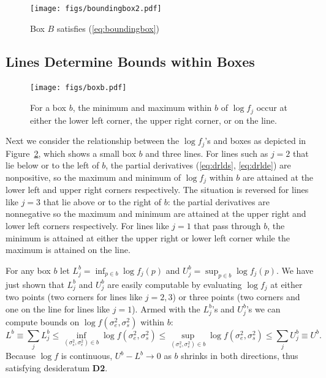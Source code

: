 \documentclass{report}
\newcommand{\RL}{f}
\newcommand{\logRL}{\log\RL}
\newcommand{\sigssq}{\sigma_s^2}
\newcommand{\sigesq}{\sigma_e^2}
\newcommand{\logRLss}{\logRL(\sigesq,\sigssq)}
\begin{document}
\begin{figure}[h]
	\centering
	\texttt{[image: figs/boundingbox2.pdf]}
	\caption{Box $B$ satisfies (\ref{eq:boundingbox})}
	\label{fig:boundingbox2}
\end{figure}

\subsection{Lines Determine Bounds within Boxes}
\label{sec:boundsinboxes}
\begin{figure}
	\centering
	\texttt{[image: figs/boxb.pdf]}
	\caption{For a box $b$,  the minimum and
	maximum within $b$ of $\logRL_j$
	occur at either the lower left corner, the upper right  corner, or
	on the line.
}	\label{fig:boxb}
\end{figure}
Next we consider the relationship between the $\logRL_j$'s and boxes as depicted in Figure~\ref{fig:boxb}, which shows a small box $b$ and three lines.  For lines such as $j=2$ that lie below or to the left of $b$, the partial derivatives (\ref{eq:drlds}, \ref{eq:drlde}) are nonpositive, so the maximum and minimum of $\logRL_j$ within $b$ are attained at the lower left and upper right corners respectively.  The situation is reversed for lines like $j=3$ that lie above or to the right of $b$: the partial derivatives are nonnegative so the maximum and minimum are attained at the upper right and lower left corners respectively.  For lines like $j=1$ that pass through $b$, the minimum is attained at either the upper right or lower left corner while the maximum is attained on the line.

For any box $b$ let $L^b_j = \inf_{p\in b} \logRL_j(p)$ and $U^b_j = \sup_{p\in b} \logRL_j(p)$.  We have just shown that $L^b_j$ and $U^b_j$ are easily computable by evaluating $\logRL_j$ at either two points (two corners for lines like $j=2,3$) or three points (two corners and one on the line for lines like $j=1$).
Armed with the $L^b_j$'s and $U^b_j$'s we can compute bounds on $\logRLss$ within $b$:
\begin{equation}
\label{eq:bounds}
	L^b \equiv \sum_j L^b_j \le \inf_{(\sigssq,\sigesq)\in b} \logRLss \le
	\sup_{(\sigssq,\sigesq)\in b} \logRLss \le \sum_j U^b_j \equiv U^b.
\end{equation}
Because $\logRL$ is continuous, $U^b - L^b \rightarrow 0$ as $b$ shrinks in both directions, thus satisfying desideratum \textbf{D2}.
\end{document}
